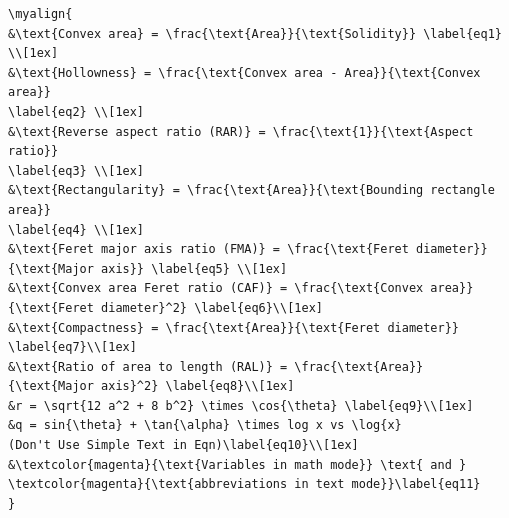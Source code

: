 \documentclass[phd]{ndsu-thesis-2022}
\begin{document}
\vspace{1ex}
{\singlespacing
\begin{verbatim}
\myalign{
&\text{Convex area} = \frac{\text{Area}}{\text{Solidity}} \label{eq1} \\[1ex]
&\text{Hollowness} = \frac{\text{Convex area - Area}}{\text{Convex area}} 
\label{eq2} \\[1ex]
&\text{Reverse aspect ratio (RAR)} = \frac{\text{1}}{\text{Aspect ratio}} 
\label{eq3} \\[1ex]
&\text{Rectangularity} = \frac{\text{Area}}{\text{Bounding rectangle area}} 
\label{eq4} \\[1ex]
&\text{Feret major axis ratio (FMA)} = \frac{\text{Feret diameter}}
{\text{Major axis}} \label{eq5} \\[1ex]
&\text{Convex area Feret ratio (CAF)} = \frac{\text{Convex area}}
{\text{Feret diameter}^2} \label{eq6}\\[1ex]
&\text{Compactness} = \frac{\text{Area}}{\text{Feret diameter}} 
\label{eq7}\\[1ex]
&\text{Ratio of area to length (RAL)} = \frac{\text{Area}}
{\text{Major axis}^2} \label{eq8}\\[1ex]
&r = \sqrt{12 a^2 + 8 b^2} \times \cos{\theta} \label{eq9}\\[1ex]
&q = sin{\theta} + \tan{\alpha} \times log x vs \log{x} 
(Don't Use Simple Text in Eqn)\label{eq10}\\[1ex]
&\textcolor{magenta}{\text{Variables in math mode}} \text{ and }  
\textcolor{magenta}{\text{abbreviations in text mode}}\label{eq11}
}
\end{verbatim}
}

\end{document}
